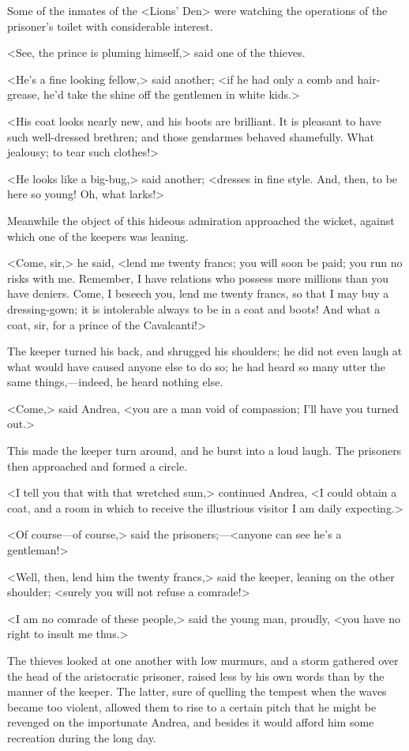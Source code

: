  Some of the inmates of the <Lions' Den> were watching the operations of the prisoner's toilet with considerable interest. 

 <See, the prince is pluming himself,> said one of the thieves. 

 <He's a fine looking fellow,> said another; <if he had only a comb and hair-grease, he'd take the shine off the gentlemen in white kids.> 

 <His coat looks nearly new, and his boots are brilliant. It is pleasant to have such well-dressed brethren; and those gendarmes behaved shamefully. What jealousy; to tear such clothes!> 

 <He looks like a big-bug,> said another; <dresses in fine style. And, then, to be here so young! Oh, what larks!> 

 Meanwhile the object of this hideous admiration approached the wicket, against which one of the keepers was leaning. 

 <Come, sir,> he said, <lend me twenty francs; you will soon be paid; you run no risks with me. Remember, I have relations who possess more millions than you have deniers. Come, I beseech you, lend me twenty francs, so that I may buy a dressing-gown; it is intolerable always to be in a coat and boots! And what a coat, sir, for a prince of the Cavalcanti!> 

 The keeper turned his back, and shrugged his shoulders; he did not even laugh at what would have caused anyone else to do so; he had heard so many utter the same things,—indeed, he heard nothing else. 

 <Come,> said Andrea, <you are a man void of compassion; I'll have you turned out.> 

 This made the keeper turn around, and he burst into a loud laugh. The prisoners then approached and formed a circle. 

 <I tell you that with that wretched sum,> continued Andrea, <I could obtain a coat, and a room in which to receive the illustrious visitor I am daily expecting.> 

 <Of course—of course,> said the prisoners;—<anyone can see he's a gentleman!> 

 <Well, then, lend him the twenty francs,> said the keeper, leaning on the other shoulder; <surely you will not refuse a comrade!>

<I am no comrade of these people,> said the young man, proudly, <you have no right to insult me thus.> 

 The thieves looked at one another with low murmurs, and a storm gathered over the head of the aristocratic prisoner, raised less by his own words than by the manner of the keeper. The latter, sure of quelling the tempest when the waves became too violent, allowed them to rise to a certain pitch that he might be revenged on the importunate Andrea, and besides it would afford him some recreation during the long day. 

